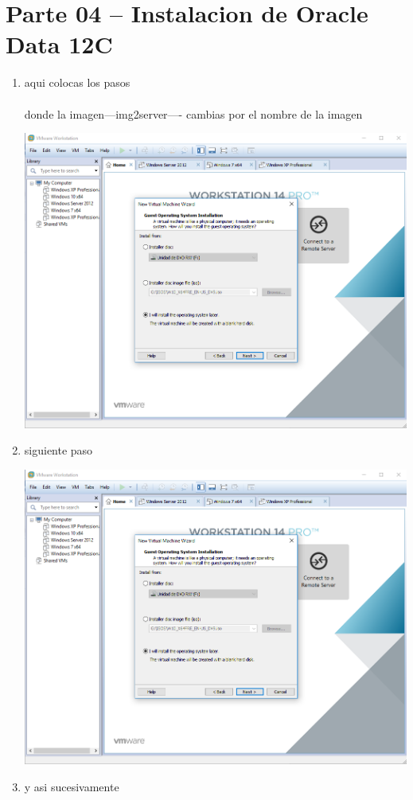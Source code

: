 \section{Parte 04 – Instalacion de Oracle Data 12C} 

\begin{enumerate}[1.]
	\item aqui colocas los pasos
	\\\\donde la imagen---img2server---- cambias por el nombre de la imagen
	\begin{center}
	\includegraphics[width=15cm]{./Imagenes/img2server} 
	\end{center}

	\item siguiente paso

	\begin{center}
	\includegraphics[width=15cm]{./Imagenes/img2server} 
	\end{center}


	\item y asi sucesivamente

	

\end{enumerate} 
